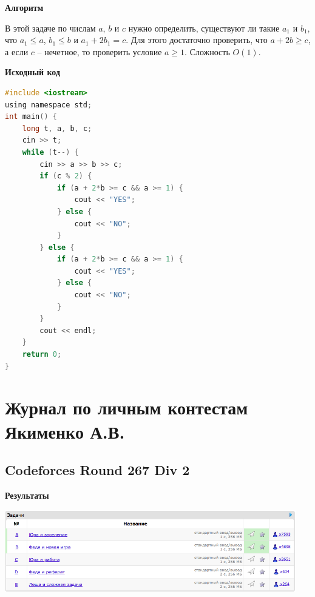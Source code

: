 \documentclass[a4paper,12pt]{article}
\begin{document}
\textbf{{\large Алгоритм}}

В этой задаче по числам $a$, $b$ и $c$ нужно определить, существуют ли такие $a_1$ и $b_1$, что $a_1 \leq a$, $b_1 \leq b$ и $a_1 + 2b_1 = c$. Для этого достаточно проверить, что $a + 2b \geq c$, а если $c$ -- нечетное, то проверить условие $a \geq 1$. Сложность $O(1)$.

\newpage
\textbf{{\large Исходный код}} \\
\begin{lstlisting}[language=C]
#include <iostream>
using namespace std;
int main() {
	long t, a, b, c;
	cin >> t;
	while (t--) {
		cin >> a >> b >> c;
		if (c % 2) {
			if (a + 2*b >= c && a >= 1) {
				cout << "YES";
			} else {
				cout << "NO";
			}
		} else {
			if (a + 2*b >= c && a >= 1) {
				cout << "YES";
			} else {
				cout << "NO";
			}
		}
		cout << endl;
	}
	return 0;
}
\end{lstlisting}









\newpage
\section{Журнал по личным контестам Якименко А.В.}

%
%

\subsection{Codeforces Round 267 Div 2}

\textbf{{\large Результаты}} \\
\begin{center}
\includegraphics[width=0.95\textwidth]{C_267/A_C_267_result.png}\\ [1cm]
\end{center}
\end{document}
